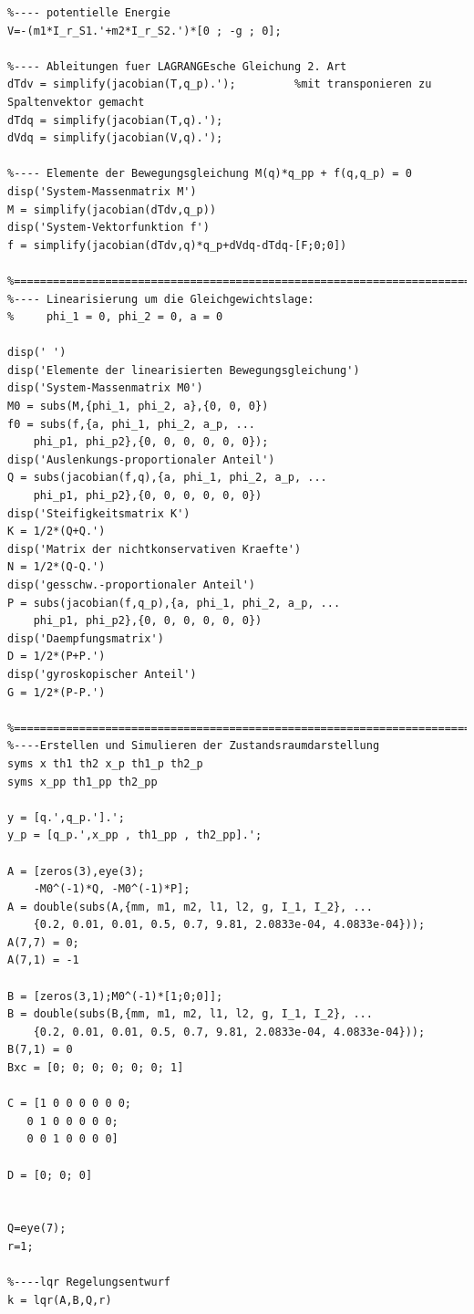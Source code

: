 \documentclass[a4paper, 10pt]{report}
\begin{document}
\begin{lstlisting}
%---- potentielle Energie
V=-(m1*I_r_S1.'+m2*I_r_S2.')*[0 ; -g ; 0];

%---- Ableitungen fuer LAGRANGEsche Gleichung 2. Art
dTdv = simplify(jacobian(T,q_p).');         %mit transponieren zu Spaltenvektor gemacht
dTdq = simplify(jacobian(T,q).');
dVdq = simplify(jacobian(V,q).');

%---- Elemente der Bewegungsgleichung M(q)*q_pp + f(q,q_p) = 0
disp('System-Massenmatrix M')
M = simplify(jacobian(dTdv,q_p))
disp('System-Vektorfunktion f')
f = simplify(jacobian(dTdv,q)*q_p+dVdq-dTdq-[F;0;0])

%==========================================================================
%---- Linearisierung um die Gleichgewichtslage:
%     phi_1 = 0, phi_2 = 0, a = 0

disp(' ')
disp('Elemente der linearisierten Bewegungsgleichung')
disp('System-Massenmatrix M0')
M0 = subs(M,{phi_1, phi_2, a},{0, 0, 0})
f0 = subs(f,{a, phi_1, phi_2, a_p, ...
    phi_p1, phi_p2},{0, 0, 0, 0, 0, 0});
disp('Auslenkungs-proportionaler Anteil')
Q = subs(jacobian(f,q),{a, phi_1, phi_2, a_p, ...
    phi_p1, phi_p2},{0, 0, 0, 0, 0, 0})
disp('Steifigkeitsmatrix K')
K = 1/2*(Q+Q.')
disp('Matrix der nichtkonservativen Kraefte')
N = 1/2*(Q-Q.')
disp('gesschw.-proportionaler Anteil')
P = subs(jacobian(f,q_p),{a, phi_1, phi_2, a_p, ...
    phi_p1, phi_p2},{0, 0, 0, 0, 0, 0})
disp('Daempfungsmatrix')
D = 1/2*(P+P.')
disp('gyroskopischer Anteil')
G = 1/2*(P-P.')

%==========================================================================
%----Erstellen und Simulieren der Zustandsraumdarstellung
syms x th1 th2 x_p th1_p th2_p
syms x_pp th1_pp th2_pp

y = [q.',q_p.'].';
y_p = [q_p.',x_pp , th1_pp , th2_pp].';

A = [zeros(3),eye(3);
    -M0^(-1)*Q, -M0^(-1)*P];
A = double(subs(A,{mm, m1, m2, l1, l2, g, I_1, I_2}, ...
    {0.2, 0.01, 0.01, 0.5, 0.7, 9.81, 2.0833e-04, 4.0833e-04}));
A(7,7) = 0;
A(7,1) = -1

B = [zeros(3,1);M0^(-1)*[1;0;0]];
B = double(subs(B,{mm, m1, m2, l1, l2, g, I_1, I_2}, ...
    {0.2, 0.01, 0.01, 0.5, 0.7, 9.81, 2.0833e-04, 4.0833e-04}));
B(7,1) = 0
Bxc = [0; 0; 0; 0; 0; 0; 1]

C = [1 0 0 0 0 0 0;
   0 1 0 0 0 0 0;
   0 0 1 0 0 0 0]

D = [0; 0; 0]


Q=eye(7);
r=1;

%----lqr Regelungsentwurf
k = lqr(A,B,Q,r)


\end{lstlisting}
\end{document}
